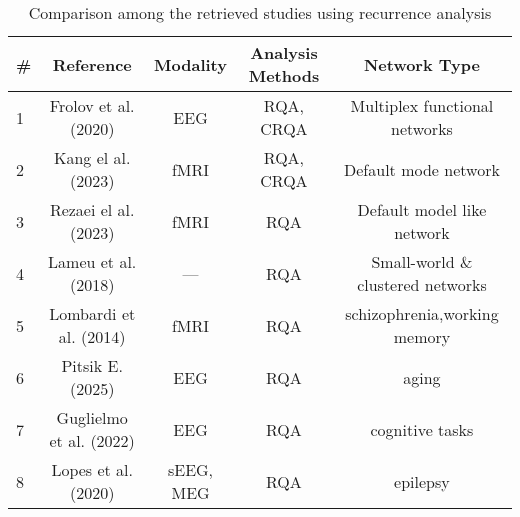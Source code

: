 \documentclass{article}
\begin{document}
\begin{table}[h]
\centering
\caption{Comparison among the retrieved studies using recurrence analysis}
\label{tab:comparison}
\begin{tabular}{@{}lcccc@{}}
\toprule
\# & Reference & Modality & Analysis Methods & Network Type \\
\midrule
1 & Frolov et al. (2020) & EEG & RQA, CRQA & Multiplex functional networks \\
2 & Kang el al. (2023) & fMRI & RQA, CRQA & Default mode network \\
3 & Rezaei el al. (2023) & fMRI & RQA & Default model like network \\
4 & Lameu et al. (2018) & --- & RQA & Small-world \& clustered networks \\
5 & Lombardi et al. (2014) & fMRI & RQA & schizophrenia,working memory \\
6 & Pitsik E. (2025) & EEG & RQA & aging \\
7 & Guglielmo et al. (2022) & EEG & RQA & cognitive tasks \\
8 & Lopes et al. (2020) & sEEG, MEG & RQA & epilepsy \\

\bottomrule
\end{tabular}
\end{table}




\end{document}
